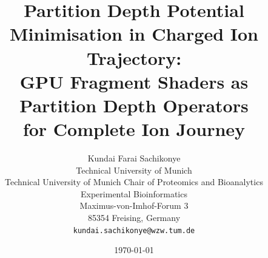 \documentclass[11pt,twocolumn,a4paper]{article}
\theoremstyle{definition}
\theoremstyle{remark}
\begin{document}
\title{\textbf{Partition Depth Potential Minimisation in Charged Ion Trajectory: \\
GPU Fragment Shaders as Partition Depth Operators \\
for Complete Ion Journey}}

\author{
Kundai Farai Sachikonye\\
Technical University of Munich\\
Technical University of Munich Chair of Proteomics and Bioanalytics \\
Experimental Bioinformatics \\
Maximus-von-Imhof-Forum 3\\
85354 Freising, Germany\\
\texttt{kundai.sachikonye@wzw.tum.de}
}

\date{\today}

\maketitle
\end{document}
